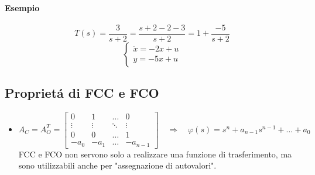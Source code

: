 \documentclass[../main.tex]{subfiles}
\begin{document}
		\paragraph{Esempio}
			\[
				T(s) = \dfrac{3}{s+2} = \dfrac{s+2-2-3}{s+2} = 1+\dfrac{-5}{s+2}
			\]
			\[
				\begin{cases}
					\dot x = -2x + u\\
					y = -5x + u
				\end{cases}
			\]
			
	\subsection{Propriet\'a di FCC e FCO}
		\begin{itemize}
			\item 
				\[
					A_C = A_O^T =
					\begin{bmatrix}
						0 & 1 & \dots & 0\\
						\vdots & \vdots & \ddots & \vdots\\
						0 & 0 & \dots & 1\\
						-a_0 & -a_1 & \dots & -a_{n-1}
					\end{bmatrix}
					\quad\Rightarrow\quad
					\varphi(s) = s^n + a_{n-1} s^{n-1} + \ldots + a_0
				\]
				FCC e FCO non servono solo a realizzare una funzione di trasferimento, ma sono utilizzabili anche per "assegnazione di autovalori".

\end{itemize}
\end{document}
